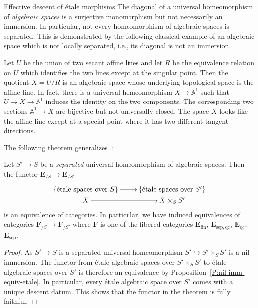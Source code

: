 \documentclass[a4paper,twoside,11pt]{amsart}[2009/07/02] %
\newcommand{\pref}[1]{\eqref{#1}}
\newcommand{\inj}{\hookrightarrow}
\newcommand{\map}[3]{#1\,:\, #2\rightarrow #3}
\newcommand{\etale}{\'{e}tale}
\newcommand{\sep}{\mathrm{sep}}
\newcommand{\A}[1]{\mathbb{A}^{#1}}    %
\newcommand{\catE}{\mathbf{E}}
\newcommand{\catF}{\mathbf{F}}
\newcommand{\qc}{\mathrm{qc}}
\newcommand{\finite}{\mathrm{fin}}
\begin{document}
\begin{section}{Effective descent of \etale{} morphisms}
The diagonal of a universal homeomorphism of \emph{algebraic spaces} is a
surjective monomorphism but not necessarily an immersion. In particular, not
every homeomorphism of algebraic spaces is separated. This is demonstrated by
the following classical example of an algebraic space which is not locally
separated, i.e., its diagonal is not an immersion.

\begin{example}
Let $U$ be the union of two secant affine lines and let $R$ be the equivalence
relation on $U$ which identifies the two lines except at the singular
point. Then the quotient $X=U/R$ is an algebraic space whose underlying
topological space is the affine line. In fact, there is a universal
homeomorphism $X\to \A{1}$ such that $U\to X\to \A{1}$ induces the identity on
the two components. The corresponding two sections $\A{1}\to X$ are bijective
but not universally closed.
The space $X$ looks like the affine line except at a special point where it has
two different tangent directions.
\end{example}

The following theorem generalizes~\cite[Exp.~IX, Thm.~4.10]{sga1}:

\begin{theorem}\label{T:etale-and-homeomorphisms}
Let $S'\to S$ be a \emph{separated} universal homeomorphism of algebraic
spaces. Then the functor $\catE_{/S}\to \catE_{/S'}$
%
$$\xymatrix@R=0pt{
{\{ \text{\etale{} spaces over $S$} \}}\ar[r] &
  {\{ \text{\etale{} spaces over $S'$} \}} \\
{X}\ar@{|->}[r] & {X\times_S S'}}$$
%
is an equivalence of categories. In particular, we have induced equivalences of
categories $\catF_{/S}\to \catF_{/S'}$ where $\catF$ is one of the fibered
categories $\catE_{\finite}$, $\catE_{\sep,\qc}$, $\catE_{\qc}$,
$\catE_{\sep}$.
%
\end{theorem}
\begin{proof}
As $S'\to S$ is a separated universal homeomorphism $S'\inj S'\times_S S'$ is a
nil-immersion. The functor from \etale{} algebraic spaces over $S'\times_S S'$
to \etale{} algebraic spaces over $S'$ is therefore an equivalence by
Proposition~\pref{P:nil-imm-equiv-etale}. In particular, every \etale{}
algebraic space over $S'$ comes with a unique descent datum. This shows that
the functor in the theorem is fully faithful.


\end{proof}
\end{section}
\end{document}
